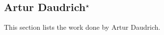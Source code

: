 \subsection[Artur Daudrich]{Artur Daudrich$^{\star}$}
This section lists the work done by Artur Daudrich.
